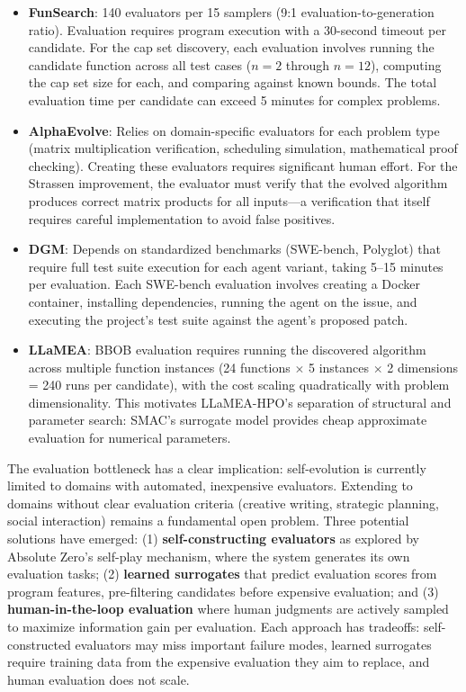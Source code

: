 \begin{itemize}
    \item \textbf{FunSearch}: 140 evaluators per 15 samplers (9:1 evaluation-to-generation ratio). Evaluation requires program execution with a 30-second timeout per candidate. For the cap set discovery, each evaluation involves running the candidate function across all test cases ($n = 2$ through $n = 12$), computing the cap set size for each, and comparing against known bounds. The total evaluation time per candidate can exceed 5 minutes for complex problems.
    \item \textbf{AlphaEvolve}: Relies on domain-specific evaluators for each problem type (matrix multiplication verification, scheduling simulation, mathematical proof checking). Creating these evaluators requires significant human effort. For the Strassen improvement, the evaluator must verify that the evolved algorithm produces correct matrix products for all inputs---a verification that itself requires careful implementation to avoid false positives.
    \item \textbf{DGM}: Depends on standardized benchmarks (SWE-bench, Polyglot) that require full test suite execution for each agent variant, taking 5--15 minutes per evaluation. Each SWE-bench evaluation involves creating a Docker container, installing dependencies, running the agent on the issue, and executing the project's test suite against the agent's proposed patch.
    \item \textbf{LLaMEA}: BBOB evaluation requires running the discovered algorithm across multiple function instances (24 functions $\times$ 5 instances $\times$ 2 dimensions = 240 runs per candidate), with the cost scaling quadratically with problem dimensionality. This motivates LLaMEA-HPO's separation of structural and parameter search: SMAC's surrogate model provides cheap approximate evaluation for numerical parameters.
\end{itemize}

The evaluation bottleneck has a clear implication: self-evolution is currently limited to domains with automated, inexpensive evaluators. Extending to domains without clear evaluation criteria (creative writing, strategic planning, social interaction) remains a fundamental open problem. Three potential solutions have emerged: (1) \textbf{self-constructing evaluators} as explored by Absolute Zero's self-play mechanism, where the system generates its own evaluation tasks; (2) \textbf{learned surrogates} that predict evaluation scores from program features, pre-filtering candidates before expensive evaluation; and (3) \textbf{human-in-the-loop evaluation} where human judgments are actively sampled to maximize information gain per evaluation. Each approach has tradeoffs: self-constructed evaluators may miss important failure modes, learned surrogates require training data from the expensive evaluation they aim to replace, and human evaluation does not scale.


